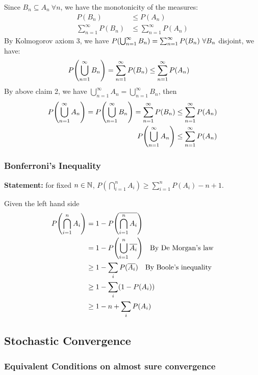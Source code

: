 \begin{prf*}
Since $B_n \subseteq A_n \ \forall n$, we have the monotonicity of the measures: 
\begin{align*}
	P(B_n) &\leq P(A_n)\\
	\sum_{n=1}^\infty P(B_n) &\leq \sum_{n=1}^\infty P(A_n)
\end{align*} 
By Kolmogorov axiom 3, we have $P\qty(\bigcup_{n=1}^\infty B_n) =  \sum_{n=1}^\infty P(B_n) \ \forall B_n$ disjoint, we have: 
\begin{align*}
	P\qty(\bigcup_{n=1}^\infty B_n) =  \sum_{n=1}^\infty P(B_n) &\leq \sum_{n=1}^\infty P(A_n)
\end{align*} 
By above claim 2, we have $\bigcup_{n=1}^\infty A_n = \bigcup_{n=1}^\infty B_n$, then
\begin{align*}
	P\qty(\bigcup_{n=1}^\infty A_n) = P\qty(\bigcup_{n=1}^\infty B_n) =  \sum_{n=1}^\infty P(B_n) &\leq \sum_{n=1}^\infty P(A_n)\\
	P\qty(\bigcup_{n=1}^\infty A_n)  &\leq \sum_{n=1}^\infty P(A_n)
\end{align*} 
\end{prf*}




\subsubsection{Bonferroni's Inequality}
\label{proof: bonferroni}
\textbf{Statement: }for fixed $n\in \mathbb{N}$,  $P(\bigcap_{i=1}^nA_i)\geq \sum_{i=1}^n P(A_i)-n+1$.

\begin{prf*}
	Given the left hand side
	\begin{align*}
		P\qty(\bigcap_{i=1}^nA_i) &= 1-P\qty(\overline{\bigcap_{i=1}^nA_i})\\
		&= 1 - P\qty(\bigcup_{i=1}^n \overline{A_i}) \quad \text{By De Morgan's law}\\
		&\geq 1-\sum_i P(\overline{A_i}) \quad\text{By Boole's inequality}\\
		&\geq 1 - \sum_i (1-P(A_i))\\
		&\geq 1 - n + \sum_i P(A_i)
	\end{align*}
\end{prf*}


\subsection{Stochastic Convergence}

\subsubsection{Equivalent Conditions on almost sure convergence}

